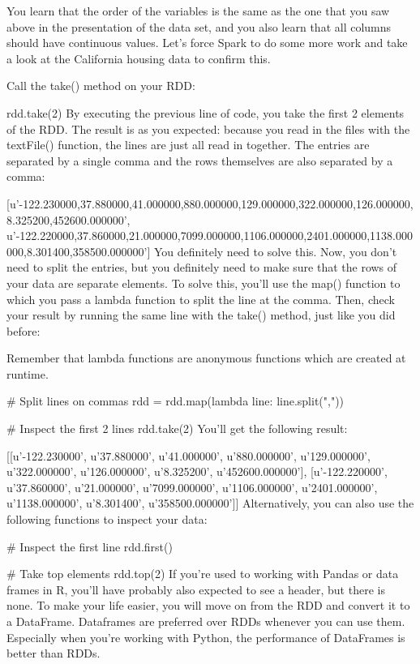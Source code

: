 \documentclass[a4paper,12pt]{article}
\begin{document}
You learn that the order of the variables is the same as the one that you saw above in the presentation of the data set, and you also learn that all columns should have continuous values. Let’s force Spark to do some more work and take a look at the California housing data to confirm this.

Call the take() method on your RDD:

rdd.take(2)
By executing the previous line of code, you take the first 2 elements of the RDD. The result is as you expected: because you read in the files with the textFile() function, the lines are just all read in together. The entries are separated by a single comma and the rows themselves are also separated by a comma:

[u'-122.230000,37.880000,41.000000,880.000000,129.000000,322.000000,126.000000,8.325200,452600.000000', u'-122.220000,37.860000,21.000000,7099.000000,1106.000000,2401.000000,1138.000000,8.301400,358500.000000']
You definitely need to solve this. Now, you don’t need to split the entries, but you definitely need to make sure that the rows of your data are separate elements. To solve this, you’ll use the map() function to which you pass a lambda function to split the line at the comma. Then, check your result by running the same line with the take() method, just like you did before:

Remember that lambda functions are anonymous functions which are created at runtime.

# Split lines on commas
rdd = rdd.map(lambda line: line.split(","))

# Inspect the first 2 lines 
rdd.take(2)
You’ll get the following result:

[[u'-122.230000', u'37.880000', u'41.000000', u'880.000000', u'129.000000', u'322.000000', u'126.000000', u'8.325200', u'452600.000000'], [u'-122.220000', u'37.860000', u'21.000000', u'7099.000000', u'1106.000000', u'2401.000000', u'1138.000000', u'8.301400', u'358500.000000']]
Alternatively, you can also use the following functions to inspect your data:

# Inspect the first line 
rdd.first()

# Take top elements
rdd.top(2)
If you’re used to working with Pandas or data frames in R, you’ll have probably also expected to see a header, but there is none. To make your life easier, you will move on from the RDD and convert it to a DataFrame. Dataframes are preferred over RDDs whenever you can use them. Especially when you’re working with Python, the performance of DataFrames is better than RDDs.
\end{document}
